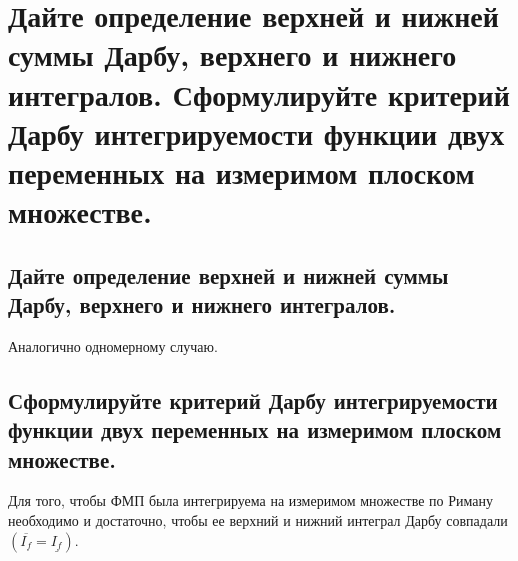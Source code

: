 \section{Дайте определение верхней и нижней суммы Дарбу, верхнего и нижнего  интегралов. Сформулируйте критерий Дарбу интегрируемости функции двух переменных на измеримом плоском множестве.}

\subsection{Дайте определение верхней и нижней суммы Дарбу, верхнего и нижнего  интегралов.}
Аналогично одномерному случаю.

\subsection{Сформулируйте критерий Дарбу интегрируемости функции двух переменных на измеримом плоском множестве.}
\begin{theorem}
    Для того, чтобы ФМП была интегрируема на измеримом множестве по Риману необходимо и достаточно, чтобы ее верхний и нижний интеграл Дарбу совпадали $(\overline{I_f} = \underline{I_f})$.
\end{theorem}